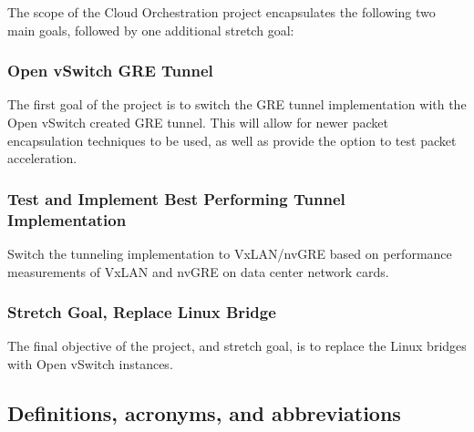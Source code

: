 \documentclass[10pt,letterpaper,onecolumn,draftclsnofoot]{IEEEtran}
\begin{document}
The scope of the Cloud Orchestration project encapsulates the following two main goals, followed
by one additional stretch goal:

\subsubsection{Open vSwitch GRE Tunnel}

The first goal of the project is to switch the GRE tunnel implementation with the Open vSwitch
created GRE tunnel. This will allow for newer packet encapsulation techniques to be used, as
well as provide the option to test packet acceleration.

\subsubsection{Test and Implement Best Performing Tunnel Implementation}

Switch the tunneling implementation to VxLAN/nvGRE based on performance measurements of VxLAN and nvGRE
on data center network cards.

\subsubsection{Stretch Goal, Replace Linux Bridge}

The final objective of the project, and stretch goal, is to replace the Linux bridges with Open
vSwitch instances.

\subsection{Definitions, acronyms, and abbreviations}
\end{document}
